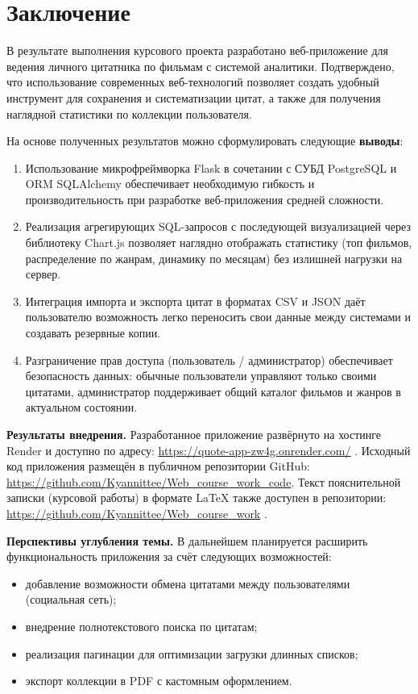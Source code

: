 \section*{Заключение}

В результате выполнения курсового проекта разработано веб-приложение для ведения личного 
цитатника по фильмам с системой аналитики. Подтверждено, что использование современных 
веб-технологий позволяет создать удобный инструмент для сохранения и систематизации цитат, 
а также для получения наглядной статистики по коллекции пользователя.

На основе полученных результатов можно сформулировать следующие \textbf{выводы}:

\begin{enumerate}
    \item Использование микрофреймворка Flask в сочетании с СУБД PostgreSQL и ORM SQLAlchemy 
    обеспечивает необходимую гибкость и производительность при разработке веб-приложения 
    средней сложности.
    \item Реализация агрегирующих SQL-запросов с последующей визуализацией через библиотеку 
    Chart.js позволяет наглядно отображать статистику (топ фильмов, распределение по жанрам, 
    динамику по месяцам) без излишней нагрузки на сервер.
    \item Интеграция импорта и экспорта цитат в форматах CSV и JSON даёт пользователю 
    возможность легко переносить свои данные между системами и создавать резервные копии.
    \item Разграничение прав доступа (пользователь / администратор) обеспечивает безопасность 
    данных: обычные пользователи управляют только своими цитатами, администратор поддерживает 
    общий каталог фильмов и жанров в актуальном состоянии.
\end{enumerate}

\textbf{Результаты внедрения.} Разработанное приложение развёрнуто на хостинге Render и 
доступно по адресу: \url{https://quote-app-zw4g.onrender.com/} \cite{render_docs}. Исходный код приложения размещён 
в публичном репозитории GitHub: \url{https://github.com/Kyannittee/Web_course_work_code}. Текст 
пояснительной записки (курсовой работы) в формате LaTeX также доступен в репозитории: 
\url{https://github.com/Kyannittee/Web_course_work} \cite{github_docs}. 

\textbf{Перспективы углубления темы.} В дальнейшем планируется расширить функциональность 
приложения за счёт следующих возможностей:
\begin{itemize}
    \item добавление возможности обмена цитатами между пользователями (социальная сеть);
    \item внедрение полнотекстового поиска по цитатам;
    \item реализация пагинации для оптимизации загрузки длинных списков;
    \item экспорт коллекции в PDF с кастомным оформлением.
\end{itemize}

